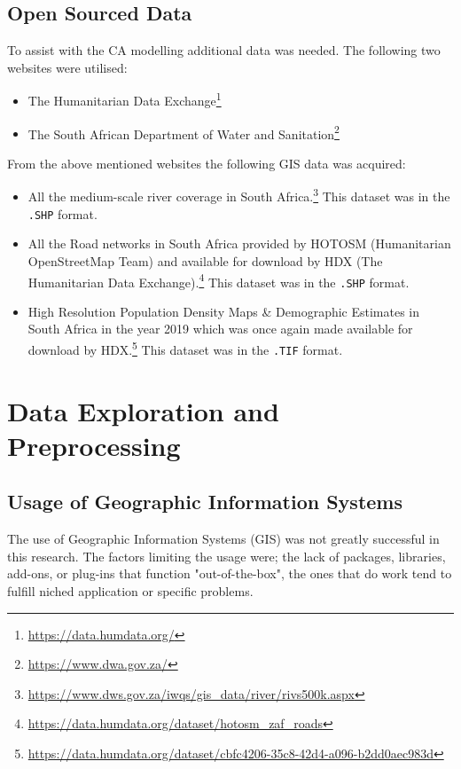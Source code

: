 \subsection{Open Sourced Data}
\label{sec:open}
To assist with the CA modelling additional data was needed. The following two websites  were utilised:
\begin{itemize}
\item The Humanitarian Data Exchange\footnote{\url{https://data.humdata.org/}}
\item The South African Department of Water and Sanitation\footnote{\url{https://www.dwa.gov.za/}}
\end{itemize}
From the above mentioned websites the following GIS data was acquired:
\begin{itemize}
\item All the medium-scale river coverage in South Africa.\footnote{\url{https://www.dws.gov.za/iwqs/gis_data/river/rivs500k.aspx}} This dataset was in the \texttt{.SHP} format.
\item All the Road networks in South Africa provided by HOTOSM (Humanitarian OpenStreetMap Team) and available for download by HDX (The Humanitarian Data Exchange).\footnote{\url{https://data.humdata.org/dataset/hotosm_zaf_roads}} This dataset was in the \texttt{.SHP} format.
\item High Resolution Population Density Maps \& Demographic Estimates in South Africa in the year 2019 which was once again made available for download by HDX.\footnote{\url{https://data.humdata.org/dataset/cbfc4206-35c8-42d4-a096-b2dd0aec983d}} This dataset was in the \texttt{.TIF} format.
\end{itemize}
\section{Data Exploration and Preprocessing}
\subsection{Usage of Geographic Information Systems}
\label{sec:GIS}
The use of Geographic Information Systems (GIS) was not greatly successful in this research. The factors limiting the usage were; the lack of packages, libraries, add-ons, or plug-ins that function "out-of-the-box", the ones that do work tend to fulfill niched application or specific problems.

